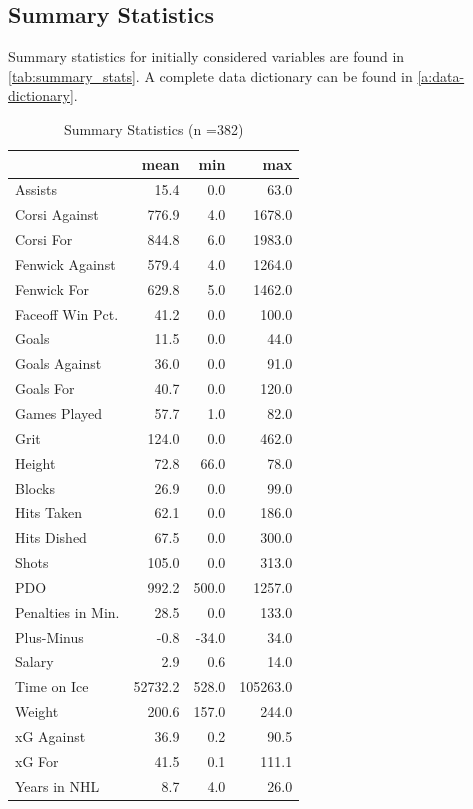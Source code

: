 \documentclass[10pt]{article}
\begin{document}
\subsection{Summary Statistics}
Summary statistics for initially considered variables are found in \autoref{tab:summary_stats}. A complete data dictionary can be found in \autoref{a:data-dictionary}. 
\begin{table}[ht]
\caption{\label{tab:summary_stats}Summary Statistics (n =382)}
\centering
\begin{tabular}[t]{lrrr}
\toprule
  & mean & min & max\\
\midrule
Assists & 15.4 & 0.0 & 63.0\\
Corsi Against & 776.9 & 4.0 & 1678.0\\
Corsi For & 844.8 & 6.0 & 1983.0\\
Fenwick Against & 579.4 & 4.0 & 1264.0\\
Fenwick For & 629.8 & 5.0 & 1462.0\\
Faceoff Win Pct. & 41.2 & 0.0 & 100.0\\
Goals & 11.5 & 0.0 & 44.0\\
Goals Against & 36.0 & 0.0 & 91.0\\
Goals For & 40.7 & 0.0 & 120.0\\
Games Played & 57.7 & 1.0 & 82.0\\
Grit & 124.0 & 0.0 & 462.0\\
Height & 72.8 & 66.0 & 78.0\\
Blocks & 26.9 & 0.0 & 99.0\\
Hits Taken & 62.1 & 0.0 & 186.0\\
Hits Dished & 67.5 & 0.0 & 300.0\\
Shots & 105.0 & 0.0 & 313.0\\
PDO & 992.2 & 500.0 & 1257.0\\
Penalties in Min. & 28.5 & 0.0 & 133.0\\
Plus-Minus & -0.8 & -34.0 & 34.0\\
Salary & 2.9 & 0.6 & 14.0\\
Time on Ice & 52732.2 & 528.0 & 105263.0\\
Weight & 200.6 & 157.0 & 244.0\\
xG Against & 36.9 & 0.2 & 90.5\\
xG For & 41.5 & 0.1 & 111.1\\
Years in NHL & 8.7 & 4.0 & 26.0\\
\bottomrule
\end{tabular}
\end{table}
\end{document}
